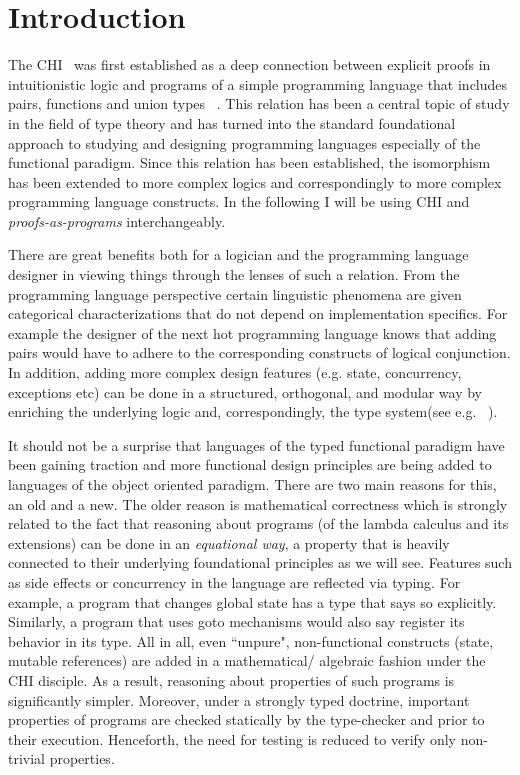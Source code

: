 \chapter{Introduction}\label{intro}
The \acrfull{CHI}~\cite{curry1934functionality,howard1995formulae} was first established as a deep connection between explicit proofs in intuitionistic logic and programs of a simple programming 
language that includes pairs, functions and union types ~\cite{Pierce:2002:TPL:509043,Srensen98lectureson}. This relation has been a central topic of study in the field of type theory and has turned into the standard
foundational approach to studying and designing programming languages especially of the functional paradigm. Since  this relation has been  established, the 
isomorphism has been extended to more complex logics and correspondingly to more complex programming language constructs.  
In the following I will be using \acrfull{CHI} and \emph{proofs-as-programs} interchangeably.

There are great benefits both for a logician
and the programming language designer in viewing things through the lenses of such a relation. From the programming language perspective certain linguistic phenomena are given categorical characterizations that do not 
depend on implementation specifics. 
For example the designer of the next hot programming language  
knows that adding pairs would have to adhere to the corresponding constructs of 
logical conjunction. In addition, adding more complex design features 
(e.g. state, concurrency, exceptions etc) can be done in a structured, orthogonal, 
and modular way by enriching the underlying logic  and, 
correspondingly, the type system(see e.g. ~\cite{Harper:2012:PFP:2431407,CERVESATO20091044,Ong:1997:CFF:263699.263722,DBLP:conf/popl/Griffin90}).

It should not be a surprise that languages of the typed functional paradigm  
have been gaining traction and more functional design principles are being added 
to languages of the object oriented paradigm. There are two main reasons for this, 
an old and a new. The older reason is mathematical correctness which is strongly 
related to the fact that reasoning about programs (of the lambda calculus and its extensions) 
can be done in an \textit{equational way}, a property that is heavily connected 
to their underlying foundational principles as we will see. Features such as side effects 
or concurrency in the language are reflected via typing. For example,  
a program that changes global state has a type that  says so explicitly. Similarly,  
a program that uses goto mechanisms  would also say register its behavior in its type. 
All in all, even ``unpure", non-functional constructs (state, mutable references) are added 
in a mathematical/ algebraic fashion under the \ac{CHI} disciple. 
As a result, reasoning about properties of such programs is significantly simpler. 
Moreover, under a strongly typed doctrine, important properties of programs are checked 
statically by the type-checker and prior to their execution. 
Henceforth, the need for testing is reduced to verify only non-trivial properties. 


